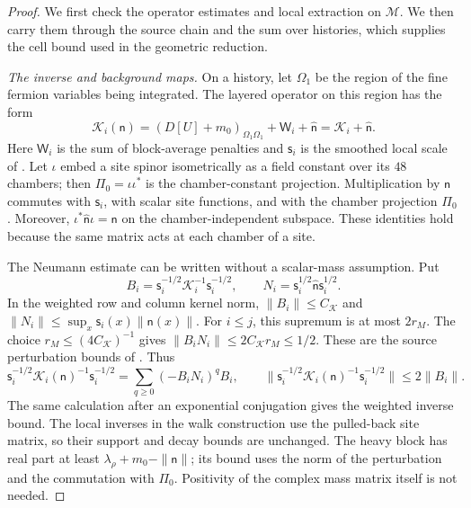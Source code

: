\documentclass[11pt,letterpaper,reqno]{amsart}
\theoremstyle{definition}
\theoremstyle{remark}
\begin{document}
\begin{proof}
We first check the operator estimates and local extraction
on $\mathcal M$. We then carry them through the source
chain and the sum over histories, which supplies the cell
bound used in the geometric reduction.

\emph{The inverse and background maps.}
On a history, let $\Omega_1$ be the region of the fine
fermion variables being integrated. The layered operator
on this region has the form
\[
 \mathcal K_i(\mathsf n)
  =(D[U]+m_0)_{\Omega_1\Omega_1}
       +\mathsf W_i+\hat{\mathsf n}
  =\mathcal K_i+\hat{\mathsf n}.
\]
Here $\mathsf W_i$ is the sum of block-average penalties
and $\mathsf s_i$ is the smoothed local scale of
\cite[Section 6]{QCDM1}. Let $\iota$ embed a site spinor
isometrically as a field constant over its $48$ chambers;
then $\Pi_0=\iota\iota^*$ is the chamber-constant projection.
Multiplication by $\mathsf n$
commutes with $\mathsf s_i$, with scalar site functions,
and with the chamber projection $\Pi_0$. Moreover,
$\iota^*\hat{\mathsf n}\iota=\mathsf n$ on the
chamber-independent subspace. These identities hold
because the same matrix acts at each chamber of a site.

The Neumann estimate can be written without a scalar-mass
assumption. Put
\[
 B_i=\mathsf s_i^{-1/2}\mathcal K_i^{-1}\mathsf s_i^{-1/2},
 \qquad
 N_i=\mathsf s_i^{1/2}\hat{\mathsf n}\mathsf s_i^{1/2}.
\]
In the weighted row and column kernel norm,
$\|B_i\|\le C_{\mathcal K}$ and
$\|N_i\|\le\sup_x\mathsf s_i(x)\|\mathsf n(x)\|$.
For $i\le j$, this supremum is at most $2r_M$.
The choice $r_M\le(4C_{\mathcal K})^{-1}$ gives
$\|B_iN_i\|\le2C_{\mathcal K}r_M\le1/2$.
These are the source perturbation bounds of
\cite[Lem. 6.5 and Section 10]{QCDM1}. Thus
\begin{equation}\label{eq:qcdm2-current-Neumann}
 \mathsf s_i^{-1/2}\mathcal K_i(\mathsf n)^{-1}
       \mathsf s_i^{-1/2}
 =\sum_{q\ge0}(-B_iN_i)^qB_i,
 \qquad
 \|\mathsf s_i^{-1/2}\mathcal K_i(\mathsf n)^{-1}
       \mathsf s_i^{-1/2}\|\le2\|B_i\|.
\end{equation}
The same calculation after an exponential conjugation
gives the weighted inverse bound. The local inverses in
the walk construction use the pulled-back site matrix,
so their support and decay bounds are unchanged.
The heavy block has real part at least
$\lambda_\rho+m_0-\|\mathsf n\|$; its bound uses the
norm of the perturbation and the commutation with
$\Pi_0$. Positivity of the complex mass matrix itself
is not needed.


\end{proof}
\end{document}
